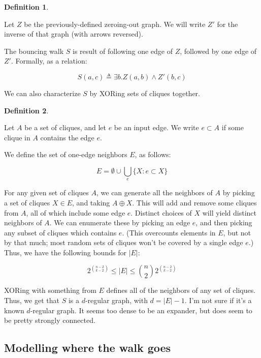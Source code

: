 \documentclass[12pt]{article}
\theoremstyle{definition}
\newtheorem{defn}{Definition}[section]
\begin{document}
\begin{defn} \label{def:bouncingWalk}

Let $Z$ be the previously-defined zeroing-out graph. We will write $Z'$ for
the inverse of that graph (with arrows reversed).

The bouncing walk $S$ is result of following one edge of $Z$, followed by one
edge of $Z'$. Formally, as a relation:

\[
S(a,c) \triangleq \exists b. Z(a,b) \land Z'(b,c)
\]

\end{defn}

We can also characterize $S$ by XORing sets of cliques together.

\begin{defn} \label{def:oneEdgeNeighbors}

Let $A$ be a set of cliques, and let $e$ be an input edge. We write
$e \subset A$ if some clique in $A$ contains the edge $e$.

We define the set of one-edge neighbors $E$, as follows:

\[
E = \emptyset \cup \bigcup_e \{ X: e \subset X\}
\]

\end{defn}

For any given set of cliques $A$, we can generate all the neighbors
of $A$ by picking a set of cliques $X \in E$, and taking $A \oplus X$. This will
add and remove some cliques from $A$, all of which include some edge $e$.
Distinct choices of $X$ will yield distinct neighbors of $A$.
We can enumerate these by picking an edge $e$, 
and then picking any subset of cliques which contains $e$. (This overcounts
elements in $E$, but not by that much; most random sets of cliques won't be
covered by a single edge $e$.) Thus, we have the following bounds for $|E|$:

\[
2^{{n-2} \choose {k-2}} \le |E| \le {n \choose 2} 2^{{n-2} \choose {k-2}}
\]

XORing with something from $E$ defines all of the neighbors of any set of cliques.
Thus, we get that $S$ is a $d$-regular graph, with $d = |E|-1$.
I'm not sure if it's a known $d$-regular graph.
It seems too
dense to be an expander, but does seem to be pretty strongly connected.

\subsection{Modelling where the walk goes}
\end{document}
